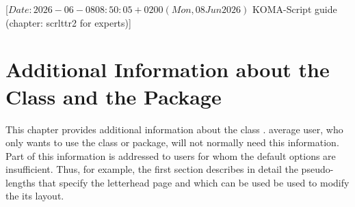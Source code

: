 %
%
%
%
%
%
%

                 [$Date: 2026-06-08 08:50:05 +0200 (Mon, 08 Jun 2026) $
                  KOMA-Script guide (chapter: scrlttr2 for experts)]


\chapter{Additional Information about the  Class and the
  Package}

\BeginIndexGroup
{}
This chapter provides additional information about the \KOMAScript{} class
.  average user, who only wants to use the class
or package, will not normally need this information. Part of this information
is addressed to users for whom the default options are insufficient. Thus,
for example, the first section describes in detail the pseudo-lengths that
specify the letterhead page and which can be used be used to modify the its
layout.%

